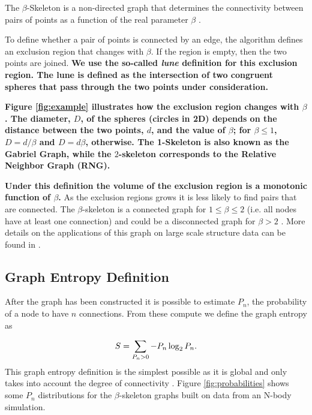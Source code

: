 \documentclass[fleqn,usenatbib]{mnras}
\begin{document}
The $\beta$-Skeleton is a non-directed graph that determines the
connectivity between pairs of points as a function of the real
parameter $\beta$ \citep{1985Kirkpatrick}. 

To define whether a pair of points is connected by an edge, the
algorithm defines an exclusion region that changes with $\beta$.  
If the region is empty, then the two points are joined.
\textbf{We use the so-called \emph{lune} definition for this exclusion region.
The lune is defined as the intersection of two congruent spheres that
pass through the two points under consideration.}

\textbf{Figure \ref{fig:example} illustrates how the exclusion region changes
with $\beta$.
The diameter, $D$, of the spheres (circles in 2D) depends on the
distance between the two points, $d$, and the value of $\beta$; for
$\beta \leq 1$, $D=d/\beta$ and $D=d\beta$, otherwise.
The 1-Skeleton is also known as the Gabriel Graph, while the
$2$-skeleton corresponds to the Relative Neighbor Graph (RNG). }

\textbf{Under this definition the volume of the exclusion region is a
monotonic function of $\beta$.}
As the exclusion regions grows it is less likely to find pairs that are connected.
The $\beta$-skeleton is a connected graph for $1\leq \beta\leq 2$
(i.e. all nodes have at least
one connection) and could be a disconnected graph for $\beta>2$ \citep{bose2002spanning}.
More details on the applications of this graph on large scale structure data
can be found in \citep{2019MNRAS.485.5276F}.

\subsection{Graph Entropy Definition}

After the graph has been constructed it is possible to estimate $P_n$, the probability of 
a node to have $n$ connections.
From these compute we define the graph entropy as

\begin{equation}
\centering
    S = \displaystyle\sum_{P_n>0}-P_n\log_2{P_n}.
    \label{ecuacionEntropia}
\end{equation}
%
This graph entropy definition is the simplest possible as it is global and only 
takes into account the degree of connectivity \citep{2012Entrp..14..559M}. 
Figure \ref{fig:probabilities} shows some $P_n$ distributions for the 
$\beta$-skeleton graphs built on data from an N-body simulation.
\end{document}
